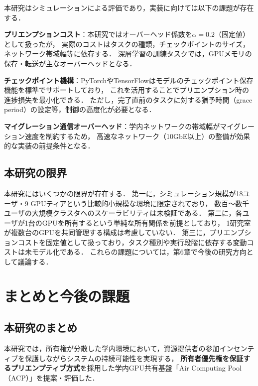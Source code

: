 \documentclass[12pt,a4paper]{jsarticle}
\begin{document}
本研究はシミュレーションによる評価であり，実装に向けては以下の課題が存在する．

\textbf{プリエンプションコスト}：本研究ではオーバーヘッド係数を$\alpha = 0.2$（固定値）として扱ったが，
実際のコストはタスクの種類，チェックポイントのサイズ，ネットワーク帯域幅等に依存する．
深層学習の訓練タスクでは，GPUメモリの保存・転送が主なオーバーヘッドとなる．

\textbf{チェックポイント機構}：PyTorchやTensorFlowはモデルのチェックポイント保存機能を標準でサポートしており，
これを活用することでプリエンプション時の進捗損失を最小化できる．
ただし，完了直前のタスクに対する猶予時間（grace period）の設定等，制御の高度化が必要となる．

\textbf{マイグレーション通信オーバーヘッド}：学内ネットワークの帯域幅がマイグレーション速度を制約するため，
高速なネットワーク（10GbE以上）の整備が効果的な実装の前提条件となる．

\subsection{本研究の限界}

本研究にはいくつかの限界が存在する．
第一に，シミュレーション規模が18ユーザ・9 GPUティアという比較的小規模な環境に限定されており，
数百〜数千ユーザの大規模クラスタへのスケーラビリティは未検証である．
第二に，各ユーザが1台のGPUを所有するという単純な所有関係を前提としており，
1研究室が複数台のGPUを共同管理する構成は考慮していない．
第三に，プリエンプションコストを固定値として扱っており，タスク種別や実行段階に依存する変動コストは未モデル化である．
これらの課題については，第6章で今後の研究方向として議論する．

\section{まとめと今後の課題}

\subsection{本研究のまとめ}

本研究では，所有権が分散した学内環境において，資源提供者の参加インセンティブを保護しながらシステムの持続可能性を実現する，
\textbf{所有者優先権を保証するプリエンプティブ方式}を採用した学内GPU共有基盤「Air Computing Pool（ACP）」を提案・評価した．
\end{document}

